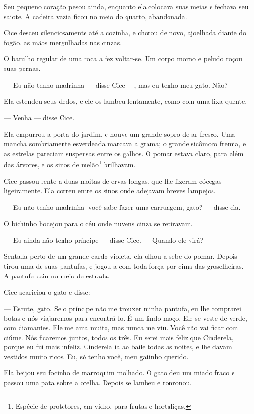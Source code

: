 Seu pequeno coração pesou ainda, enquanto ela colocava suas meias e
fechava seu saiote. A cadeira vazia ficou no meio do quarto, abandonada.

Cice desceu silenciosamente até a cozinha, e chorou de novo, ajoelhada
diante do fogão, as mãos mergulhadas nas cinzas.

O barulho regular de uma roca a fez voltar-se. Um corpo morno e peludo
roçou suas pernas.

--- Eu não tenho madrinha --- disse Cice ---, mas eu tenho meu gato. Não?

Ela estendeu seus dedos, e ele os lambeu lentamente, como com uma lixa
quente.

--- Venha --- disse Cice.

Ela empurrou a porta do jardim, e houve um grande sopro de ar fresco.
Uma mancha sombriamente esverdeada marcava a grama; o grande sicômoro
fremia, e as estrelas pareciam suspensas entre os galhos. O pomar estava
claro, para além das árvores, e os sinos de melão\footnote{ Espécie de
protetores, em vidro, para frutas e hortaliças.} brilhavam.

Cice passou rente a duas moitas de ervas longas, que lhe fizeram
cócegas ligeiramente. Ela correu entre os sinos onde adejavam breves
lampejos.

--- Eu não tenho madrinha: você sabe fazer uma carruagem, gato? --- disse
ela.

O bichinho bocejou para o céu onde nuvens cinza se retiravam.

--- Eu ainda não tenho príncipe --- disse Cice. --- Quando ele virá?

Sentada perto de um grande cardo violeta, ela olhou a sebe do pomar.
Depois tirou uma de suas pantufas, e jogou-a com toda força por cima das
groselheiras. A pantufa caiu no meio da estrada.

Cice acariciou o gato e disse:

--- Escute, gato. Se o príncipe não me trouxer minha pantufa, eu lhe
comprarei botas e nós viajaremos para encontrá-lo. É um lindo moço. Ele se
veste de verde, com diamantes. Ele me ama muito, mas nunca me viu. Você
não vai ficar com ciúme. Nós ficaremos juntos, todos os três. Eu serei
mais feliz que Cinderela, porque eu fui mais infeliz. Cinderela ia ao
baile todas as noites, e lhe davam vestidos muito ricos. Eu, só tenho
você, meu gatinho querido.

Ela beijou seu focinho de marroquim molhado. O gato deu um miado fraco
e passou uma pata sobre a orelha. Depois se lambeu e ronronou.

